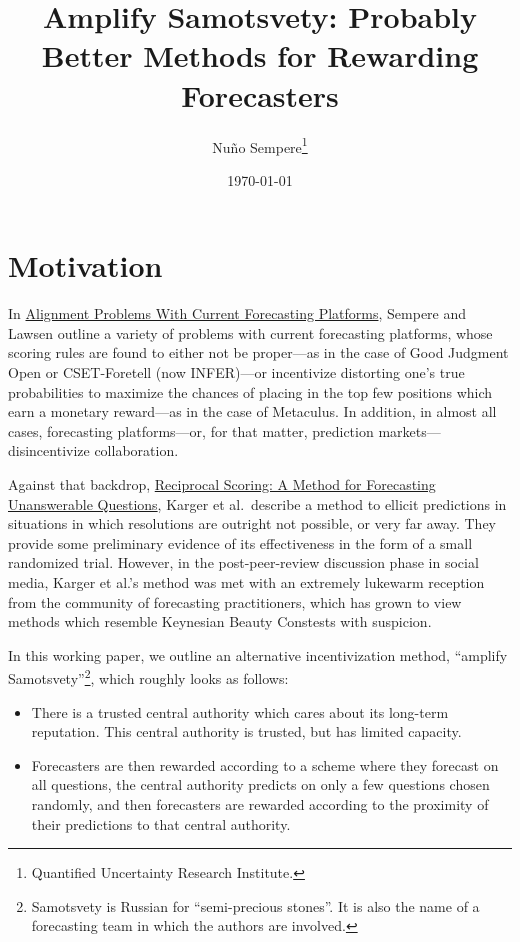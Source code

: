 \documentclass[]{article}
\title{Amplify Samotsvety: Probably Better Methods for Rewarding Forecasters}
\author{Nuño Sempere\footnote{Quantified Uncertainty Research Institute.}}
\date{\today}
\providecommand{\tightlist}{%
  \setlength{\itemsep}{0pt}\setlength{\parskip}{0pt}}
\begin{document}
\maketitle

\hypertarget{motivation}{%
\section{Motivation}\label{motivation}}

In \href{https://arxiv.org/abs/2106.11248}{Alignment Problems With
Current Forecasting Platforms}, Sempere and Lawsen outline a variety of
problems with current forecasting platforms, whose scoring rules are
found to either not be proper---as in the case of Good Judgment Open or
CSET-Foretell (now INFER)---or incentivize distorting one's true
probabilities to maximize the chances of placing in the top few
positions which earn a monetary reward---as in the case of Metaculus. In
addition, in almost all cases, forecasting platforms---or, for that
matter, prediction markets---disincentivize collaboration.

Against that backdrop,
\href{https://papers.ssrn.com/sol3/papers.cfm?abstract_id=3954498}{Reciprocal
Scoring: A Method for Forecasting Unanswerable Questions}, Karger et
al.~describe a method to ellicit predictions in situations in which
resolutions are outright not possible, or very far away. They provide
some preliminary evidence of its effectiveness in the form of a small
randomized trial. However, in the post-peer-review discussion phase in
social media, Karger et al.'s method was met with an extremely lukewarm
reception from the community of forecasting practitioners, which has
grown to view methods which resemble Keynesian Beauty Constests with
suspicion.

In this working paper, we outline an alternative incentivization method,
``amplify Samotsvety''\footnote{Samotsvety is Russian for
  ``semi-precious stones''. It is also the name of a forecasting team in
  which the authors are involved.}, which roughly looks as follows:

\begin{itemize}
\tightlist
\item
  There is a trusted central authority which cares about its long-term
  reputation. This central authority is trusted, but has limited
  capacity.
\item
  Forecasters are then rewarded according to a scheme where they
  forecast on all questions, the central authority predicts on only a
  few questions chosen randomly, and then forecasters are rewarded
  according to the proximity of their predictions to that central
  authority.
\end{itemize}
\end{document}
